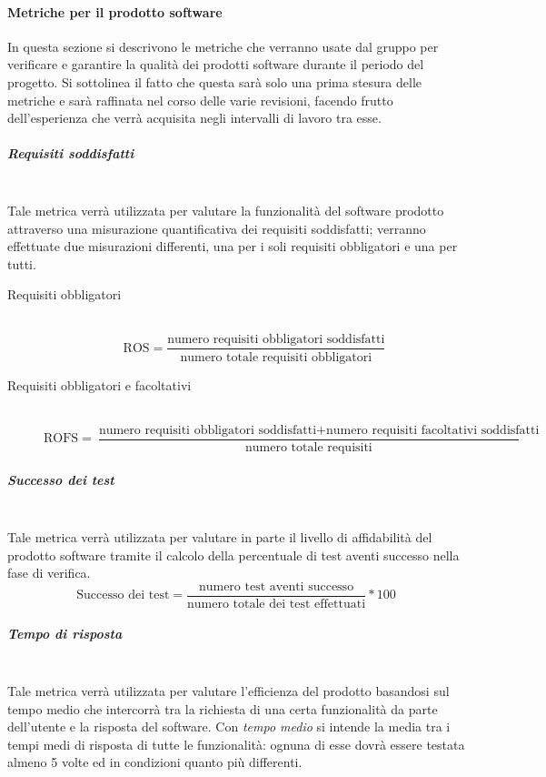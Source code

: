 \paragraph{Metriche per il prodotto software}
\label{AppB:metricheSoft}
In questa sezione si descrivono le metriche che verranno usate dal gruppo per verificare e garantire la qualità dei prodotti software durante il periodo del progetto. Si sottolinea il fatto che questa sarà solo una prima stesura delle metriche e sarà raffinata nel corso delle varie revisioni, facendo frutto dell'esperienza che verrà acquisita negli intervalli di lavoro tra esse.

\subparagraph{Requisiti soddisfatti}
\label{AppB:Funzionalita}
~\\Tale metrica verrà utilizzata per valutare la funzionalità del software prodotto attraverso una misurazione quantificativa dei requisiti soddisfatti; verranno effettuate due misurazioni differenti, una per i soli requisiti obbligatori e una per tutti.

\begin{description}
	\item[Requisiti obbligatori]
	~\\ \begin{displaymath}
		\mbox{ROS}=\frac{\mbox{numero requisiti obbligatori soddisfatti}}{\mbox{numero totale requisiti obbligatori}}
	\end{displaymath}
	
	\item[Requisiti obbligatori e facoltativi]
	~\\ \begin{displaymath}
		\mbox{ROFS}=\frac{\mbox{numero requisiti obbligatori soddisfatti} + \mbox{numero requisiti facoltativi soddisfatti}}{\mbox{numero totale requisiti}}
	\end{displaymath}
\end{description}


\subparagraph{Successo dei test}
\label{AppB:Affidabilita}
~\\Tale metrica verrà utilizzata per valutare in parte il livello di affidabilità del prodotto software tramite il calcolo della percentuale di test aventi successo nella fase di verifica.
\begin{displaymath}
	\mbox{Successo dei test}=\frac{\mbox{numero test aventi successo}}{\mbox{numero totale dei test effettuati}} * 100
\end{displaymath}


\subparagraph{Tempo di risposta}
\label{AppB:Efficienza}
~\\Tale metrica verrà utilizzata per valutare l'efficienza del prodotto basandosi sul tempo medio che intercorrà tra la richiesta di una certa funzionalità da parte dell'utente e la risposta del software. Con \textit{tempo medio} si intende la media tra i tempi medi di risposta di tutte le funzionalità: ognuna di esse dovrà essere testata almeno 5 volte ed in condizioni quanto più differenti.

